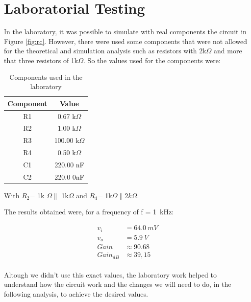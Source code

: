 \section{Laboratorial Testing} \label{sec:Lab}

In the laboratory, it was possible to simulate with real components the circuit in Figure \ref{fig:rc}. However, there were used some components that were not allowed for the theoretical and simulation analysis such as resistors with 2k$\Omega$ and more that three resistors of 1k$\Omega$. So the values used for the components were:
\begin{table}[!htb]
\centering
  \begin{tabular}{|c | c|}
    \hline    
\bf Component  & \bf Value\\ \hline 
R1  & 0.67 k$\Omega$ \\ \hline 
R2  & 1.00 k$\Omega$ \\ \hline 
R3  & 100.00 k$\Omega$ \\ \hline 
R4  & 0.50 k$\Omega$ \\ \hline 
C1  & 220.00 nF \\ \hline 
C2  & 220.0 0nF \\ \hline 

\end{tabular}
 \caption{Components used in the laboratory}\label{tab:labb}
\end{table}

With $R_2$= 1k $\Omega \parallel$ 1k$\Omega$ and $R_4$= 1k$\Omega \parallel 2k\Omega$.

The results obtained were, for a frequency of f = 1\ kHz: 

\begin{align*}
  v_i &= 64.0\ mV \\
  v_o &= 5.9\ V \\
  Gain &\approx 90.68 \\
  Gain_{dB} &\approx 39,15 \\
\end{align*}

Altough we didn't use this exact values, the laboratory work helped to understand how the circuit work and the changes we will need to do, in the following analysis, to achieve the desired values.

